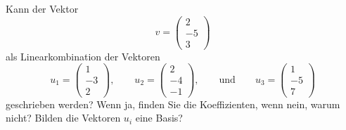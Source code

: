 Kann der Vektor
\[
v = \begin{pmatrix}
2\\-5\\3
\end{pmatrix}
\]
als Linearkombination der Vektoren
\[
u_1=\begin{pmatrix}
1\\-3\\2
\end{pmatrix},
\qquad
u_2=\begin{pmatrix}
2\\-4\\-1
\end{pmatrix},
\qquad\text{und}\qquad
u_3=\begin{pmatrix}
1\\-5\\7
\end{pmatrix}
\]
geschrieben werden? Wenn ja, finden Sie die Koeffizienten, wenn nein,
warum nicht? Bilden die Vektoren $u_i$ eine Basis?


